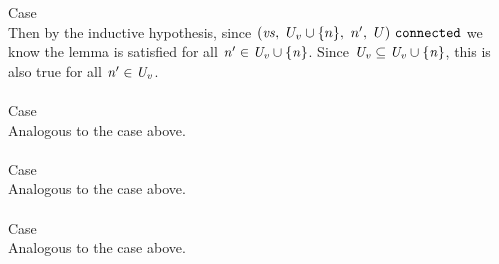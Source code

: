 \documentclass[12pt]{article}
\begin{document}
Case
\\

Then by the inductive hypothesis, since $(\mathit{vs},\ U_v \cup
  \{n\},\ n',\ U)\ \mathtt{connected}$ we know the lemma is satisfied for all
$\mathit{n'} \in \mathit{U_v \cup \{n\}}$. Since $\mathit{U_v} \subseteq
\mathit{U_v \cup \{n\}}$, this is also true for all $\mathit{n'} \in
\mathit{U_v}$.\\
\\

Case
\\

Analogous to the case above.\\
\\

Case
\\

Analogous to the case above.\\
\\

Case
\\

Analogous to the case above.\\
\\
\end{document}
